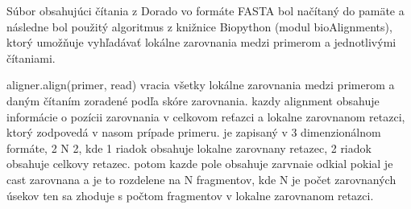 Súbor obsahujúci čítania z Dorado vo formáte FASTA bol načítaný do pamäte a následne bol použitý algoritmus z knižnice Biopython (modul bioAlignments), ktorý umožňuje vyhľadávať lokálne zarovnania medzi primerom a jednotlivými čítaniami.


aligner.align(primer, read) vracia všetky lokálne zarovnania medzi primerom
a daným čítaním zoradené podľa skóre zarovnania.
kazdy alignment obsahuje informácie o pozícii zarovnania v celkovom reťazci
a lokalne zarovnanom retazci, ktorý zodpovedá v nasom prípade primeru.
je zapisaný v 3 dimenzionálnom formáte, 2 N 2, kde 1 riadok obsahuje lokalne
zarovnany retazec, 2 riadok obsahuje celkovy retazec.
potom kazde pole obsahuje zarvnaie odkial pokial je cast zarovnana a je to 
rozdelene na N fragmentov, kde N je počet zarovnaných úsekov ten sa zhoduje
s počtom fragmentov v lokalne zarovnanom retazci.
